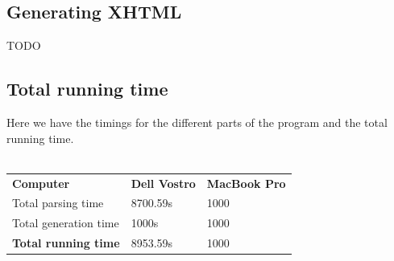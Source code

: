 \subsection{Generating XHTML}
TODO
\subsection{Total running time}
Here we have the timings for the different parts of the program and the total running time.\\\\
\begin{tabular}{l l l}
\textbf{Computer} & \textbf{Dell Vostro} & \textbf{MacBook Pro}\\
Total parsing time & 8700.59s & 1000\\
Total generation time & 1000s & 1000\\
\textbf{Total running time} & 8953.59s & 1000\\
\end{tabular}